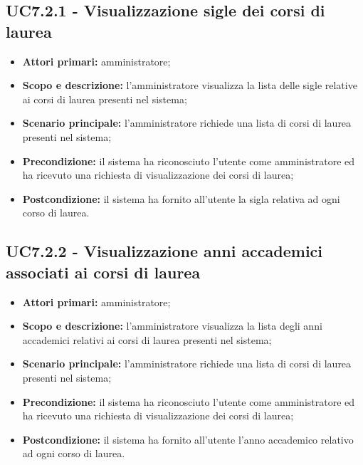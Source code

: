 \documentclass[AnalisiDeiRequisiti.tex]{subfiles}
\begin{document}
\subsection{UC7.2.1 - Visualizzazione sigle dei corsi di laurea}
\begin{itemize}
	\item \textbf{Attori primari:} amministratore;
	\item \textbf{Scopo e descrizione:} l'amministratore visualizza la lista delle sigle relative ai corsi di laurea presenti nel sistema;
	\item \textbf{Scenario principale:} l'amministratore richiede una lista di corsi di laurea presenti nel sistema;
	\item \textbf{Precondizione:} il sistema ha riconosciuto l'utente come amministratore ed ha ricevuto una richiesta di visualizzazione dei corsi di laurea; 
	\item \textbf{Postcondizione:} il sistema ha fornito all'utente la sigla relativa ad ogni corso di laurea.
\end{itemize}
\subsection{UC7.2.2 - Visualizzazione anni accademici associati ai corsi di laurea}
\begin{itemize}
	\item \textbf{Attori primari:} amministratore;
	\item \textbf{Scopo e descrizione:} l'amministratore visualizza la lista degli anni accademici relativi ai corsi di laurea presenti nel sistema;
	\item \textbf{Scenario principale:} l'amministratore richiede una lista di corsi di laurea presenti nel sistema;
	\item \textbf{Precondizione:} il sistema ha riconosciuto l'utente come amministratore ed ha ricevuto una richiesta di visualizzazione dei corsi di laurea; 
	\item \textbf{Postcondizione:} il sistema ha fornito all'utente l'anno accademico relativo ad ogni corso di laurea.
\end{itemize}
\end{document}
